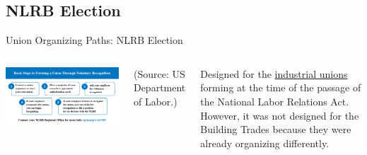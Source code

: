 \documentclass{beamer}
\begin{document}
\subsection{NLRB Election}
\begin{frame}{Union Organizing Paths: NLRB Election}
  \begin{columns}
    \includegraphics[width=0.9\linewidth]{../images/DOL}
    \begin{scriptsize}
	    \begin{center}
	    	(Source: US Department of Labor.)
	    \end{center}    
    \end{scriptsize}
    
    
     Designed for the \underline{industrial unions} forming at the time of the passage of the National Labor Relations Act.
    \newline\newline
    However, it was not designed for the Building Trades because they were already organizing differently.

    \end{columns}
\end{frame}
\end{document}
